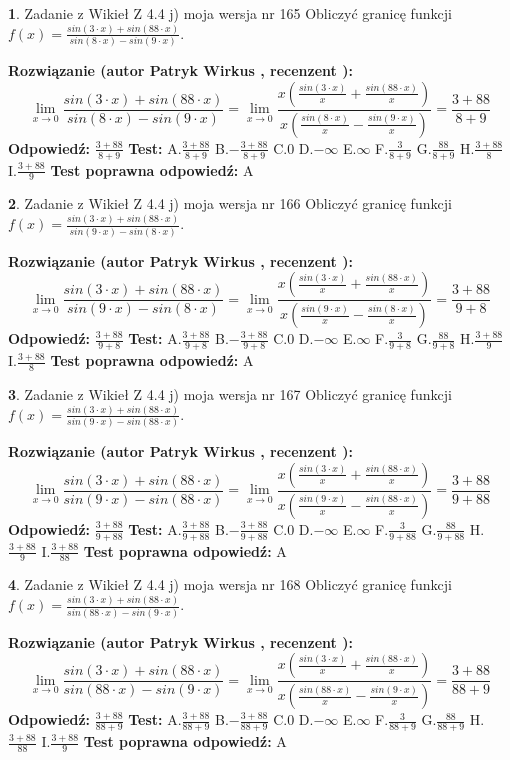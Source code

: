 \documentclass[12pt, a4paper]{article}
\theoremstyle{definition} %
\newtheorem{zad}{}
\newcommand{\zadStart}[1]{\begin{zad}#1\newline}
\newcommand{\zadStop}{\end{zad}}
\newcommand{\rozwStart}[2]{\noindent \textbf{Rozwiązanie (autor #1 , recenzent #2): }\newline}
\newcommand{\rozwStop}{\newline}
\newcommand{\odpStart}{\noindent \textbf{Odpowiedź:}\newline}
\newcommand{\odpStop}{\newline}
\newcommand{\testStart}{\noindent \textbf{Test:}\newline}
\newcommand{\testStop}{\newline}
\newcommand{\kluczStart}{\noindent \textbf{Test poprawna odpowiedź:}\newline}
\newcommand{\kluczStop}{\newline}
\begin{document}
\zadStart{Zadanie z Wikieł Z 4.4 j) moja wersja nr 165}
Obliczyć granicę funkcji $f(x)=\frac{sin(3\cdot x) +sin(88\cdot x)}{sin(8\cdot x) -sin(9\cdot x)}$.
\zadStop
\rozwStart{Patryk Wirkus}{}
$$\lim\limits_{x\to 0}\frac{sin(3\cdot x) +sin(88\cdot x)}{sin(8\cdot x) -sin(9\cdot x)}=\lim\limits_{x\to 0}\frac{x(\frac{sin(3\cdot x)}{x}+\frac{sin(88\cdot x)}{x})}{x(\frac{sin(8\cdot x)}{x}-\frac{sin(9\cdot x)}{x})}=\frac{3+88}{8+9}$$
\rozwStop
\odpStart
$\frac{3+88}{8+9}$
\odpStop
\testStart
A.$\frac{3+88}{8+9}$
B.$-\frac{3+88}{8+9}$
C.$0$
D.$-\infty$
E.$\infty$
F.$\frac{3}{8+9}$
G.$\frac{88}{8+9}$
H.$\frac{3+88}{8}$
I.$\frac{3+88}{9}$
\testStop
\kluczStart
A
\kluczStop



\zadStart{Zadanie z Wikieł Z 4.4 j) moja wersja nr 166}
Obliczyć granicę funkcji $f(x)=\frac{sin(3\cdot x) +sin(88\cdot x)}{sin(9\cdot x) -sin(8\cdot x)}$.
\zadStop
\rozwStart{Patryk Wirkus}{}
$$\lim\limits_{x\to 0}\frac{sin(3\cdot x) +sin(88\cdot x)}{sin(9\cdot x) -sin(8\cdot x)}=\lim\limits_{x\to 0}\frac{x(\frac{sin(3\cdot x)}{x}+\frac{sin(88\cdot x)}{x})}{x(\frac{sin(9\cdot x)}{x}-\frac{sin(8\cdot x)}{x})}=\frac{3+88}{9+8}$$
\rozwStop
\odpStart
$\frac{3+88}{9+8}$
\odpStop
\testStart
A.$\frac{3+88}{9+8}$
B.$-\frac{3+88}{9+8}$
C.$0$
D.$-\infty$
E.$\infty$
F.$\frac{3}{9+8}$
G.$\frac{88}{9+8}$
H.$\frac{3+88}{9}$
I.$\frac{3+88}{8}$
\testStop
\kluczStart
A
\kluczStop



\zadStart{Zadanie z Wikieł Z 4.4 j) moja wersja nr 167}
Obliczyć granicę funkcji $f(x)=\frac{sin(3\cdot x) +sin(88\cdot x)}{sin(9\cdot x) -sin(88\cdot x)}$.
\zadStop
\rozwStart{Patryk Wirkus}{}
$$\lim\limits_{x\to 0}\frac{sin(3\cdot x) +sin(88\cdot x)}{sin(9\cdot x) -sin(88\cdot x)}=\lim\limits_{x\to 0}\frac{x(\frac{sin(3\cdot x)}{x}+\frac{sin(88\cdot x)}{x})}{x(\frac{sin(9\cdot x)}{x}-\frac{sin(88\cdot x)}{x})}=\frac{3+88}{9+88}$$
\rozwStop
\odpStart
$\frac{3+88}{9+88}$
\odpStop
\testStart
A.$\frac{3+88}{9+88}$
B.$-\frac{3+88}{9+88}$
C.$0$
D.$-\infty$
E.$\infty$
F.$\frac{3}{9+88}$
G.$\frac{88}{9+88}$
H.$\frac{3+88}{9}$
I.$\frac{3+88}{88}$
\testStop
\kluczStart
A
\kluczStop



\zadStart{Zadanie z Wikieł Z 4.4 j) moja wersja nr 168}
Obliczyć granicę funkcji $f(x)=\frac{sin(3\cdot x) +sin(88\cdot x)}{sin(88\cdot x) -sin(9\cdot x)}$.
\zadStop
\rozwStart{Patryk Wirkus}{}
$$\lim\limits_{x\to 0}\frac{sin(3\cdot x) +sin(88\cdot x)}{sin(88\cdot x) -sin(9\cdot x)}=\lim\limits_{x\to 0}\frac{x(\frac{sin(3\cdot x)}{x}+\frac{sin(88\cdot x)}{x})}{x(\frac{sin(88\cdot x)}{x}-\frac{sin(9\cdot x)}{x})}=\frac{3+88}{88+9}$$
\rozwStop
\odpStart
$\frac{3+88}{88+9}$
\odpStop
\testStart
A.$\frac{3+88}{88+9}$
B.$-\frac{3+88}{88+9}$
C.$0$
D.$-\infty$
E.$\infty$
F.$\frac{3}{88+9}$
G.$\frac{88}{88+9}$
H.$\frac{3+88}{88}$
I.$\frac{3+88}{9}$
\testStop
\kluczStart
A
\kluczStop
\end{document}
